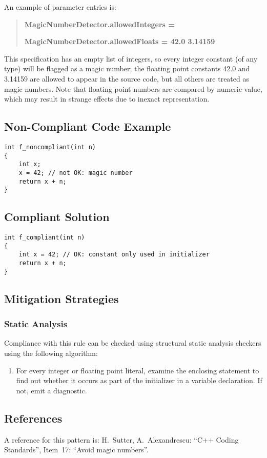 An example of parameter entries is:
\begin{quote}
{\bf MagicNumberDetector.allowedIntegers = }

{\bf MagicNumberDetector.allowedFloats = 42.0 3.14159}
\end{quote}
 
This specification has an empty list of integers, so every integer constant
(of any type) will be flagged as a magic number; the floating point constants
42.0 and 3.14159 are allowed to appear in the source code, but
all others are treated as magic numbers. Note that floating point numbers are
compared by numeric value, which may result in strange effects due to inexact
representation.


\subsection{Non-Compliant Code Example}

\begin{verbatim}
int f_noncompliant(int n)
{
    int x;
    x = 42; // not OK: magic number
    return x + n;
}
\end{verbatim}

\subsection{Compliant Solution}

\begin{verbatim}
int f_compliant(int n)
{
    int x = 42; // OK: constant only used in initializer
    return x + n;
}
\end{verbatim}

\subsection{Mitigation Strategies}
\subsubsection{Static Analysis} 

Compliance with this rule can be checked using structural static analysis checkers using the following algorithm:

\begin{enumerate}
\item For every integer or floating point literal, examine the enclosing
statement to find out whether it occurs as part of the initializer in a
variable declaration. If not, emit a diagnostic.
\end{enumerate}

\subsection{References}

A reference for this pattern is: H.~Sutter, A.~Alexandrescu: ``C++ Coding
Standards'', Item~17: ``Avoid magic numbers''. 
